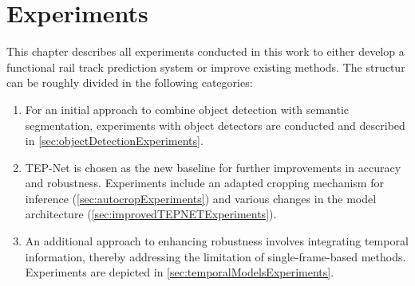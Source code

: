 \chapter{Experiments}
\label{sec:experiments}


This chapter describes all experiments conducted in this work to either develop a functional rail track prediction system or improve existing methods.
The structur can be roughly divided in the following categories:

\begin{enumerate}
    \item For an initial approach to combine object detection with semantic segmentation, experiments with object detectors are conducted and described in \autoref{sec:objectDetectionExperiments}.
    \item TEP-Net \cite{tepNet2024} is chosen as the new baseline for further improvements in accuracy and robustness. Experiments include an adapted cropping mechanism for inference (\autoref{sec:autocropExperiments}) and various changes in the model architecture (\autoref{sec:improvedTEPNETExperiments}).
    \item An additional approach to enhancing robustness involves integrating temporal information, thereby addressing the limitation of single-frame-based methods. Experiments are depicted in \autoref{sec:temporalModelsExperiments}.
\end{enumerate}













